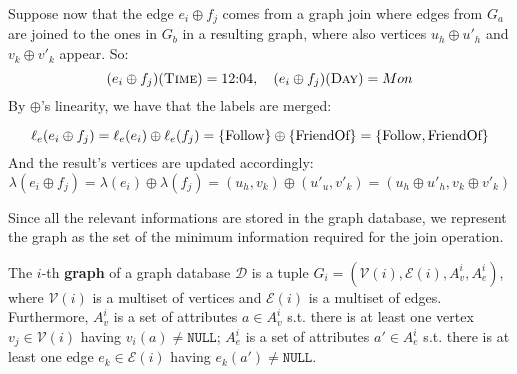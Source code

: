 



\begin{example}[continues=ex:onJoinDataModel]
Suppose now that the edge $e_i\oplus f_j$ comes from
	a graph join where edges from $G_a$ are joined to the ones in $G_b$ in a resulting graph,
	where also vertices $u_h\oplus u'_h$
	and $v_k\oplus v'_k$ appear. So:
	\[(e_i\oplus f_j)(\textsc{Time})=12\textup{:}04,\quad (e_i\oplus f_j)(\textsc{Day})=Mon\]
	By $\oplus$'s linearity, we have that the labels are merged:

	\[\ell_e(e_i\oplus f_j)=\ell_e(e_i)\oplus\ell_e(f_j)=\{\textup{Follow}\}\oplus\{\textup{FriendOf}\}=\{\textup{Follow},\textup{FriendOf}\}\]
	And the result's vertices are updated accordingly:
	\[\lambda(e_i\oplus f_j) = \lambda(e_i)\oplus\lambda(f_j)=(u_h,v_k)\oplus(u'_u,v'_k)=(u_h\oplus u'_h,v_k\oplus v'_k)\]
\end{example}

Since all the relevant informations are stored in the graph database, we represent 
the graph as the set of the minimum information required for the join operation.

\begin{definition}[Graph]
	The $i$-th \textbf{graph} of a graph da\-tabase $\mathcal{D}$ 
	is a tuple
	$G_i=(\mathcal{V}(i),\mathcal{E}(i),A_v^i,A_e^i)$, where $\mathcal{V}(i)$ is a multiset of vertices and 
	$\mathcal{E}(i)$ is a multiset of edges. Furthermore, $A_v^i$ is a set of attributes 
	$a\in A_v^i$ s.t. there is at least one vertex $v_j\in \mathcal{V}(i)$ having $v_i(a)\neq\texttt{NULL}$; $A_e^i$ is a set of attributes $a'\in A_e^i$ s.t. there
	is at least one edge $e_k\in \mathcal{E}(i)$ having $e_k(a')\neq\texttt{NULL}$.
\end{definition}

